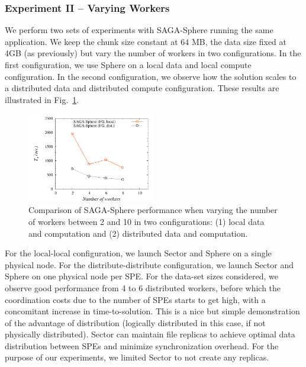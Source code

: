 \documentclass[3p,twocolumn]{elsarticle}
\begin{document}
\subsubsection{Experiment II -- Varying Workers}

We perform two sets of experiments with SAGA-Sphere running the same
\wc application.  We keep the chunk size constant at 64 MB, the data
size fixed at 4GB (as previously) but vary the number of workers in
two configurations. In the first configuration, we use Sphere on a
local data and local compute configuration. In the second
configuration, we observe how the solution scales to a distributed
data and distributed compute configuration. These results are
illustrated in Fig.~\ref{fig:sphere_varying_workers}.  

\begin{figure}[htb!]
 \includegraphics[width=0.5\textwidth]{figures/sphere_varying_workers.pdf}
 \caption{
   Comparison of SAGA-Sphere performance when varying the number of workers
   between 2 and 10 in two configurations: (1) local data and computation
   and (2) distributed data and computation.
   \label{fig:sphere_varying_workers}
   }
\end{figure}

For the
local-local configuration, we launch Sector and Sphere on a single
physical node.  For the distribute-distribute configuration, we launch
Sector and Sphere on one physical node per SPE.  For the data-set
sizes considered, we observe good performance from 4 to 6 distributed
workers, before which the coordination costs due to the number of SPEs
starts to get high, with a concomitant increase in
time-to-solution. This is a nice but simple demonstration of the
advantage of distribution (logically distributed in this case, if not
physically distributed). Sector can maintain file replicas to achieve
optimal data distribution between SPEs and minimize synchronization
overhead. For the purpose of our experiments, we limited Sector to not
create any replicas.
\end{document}
